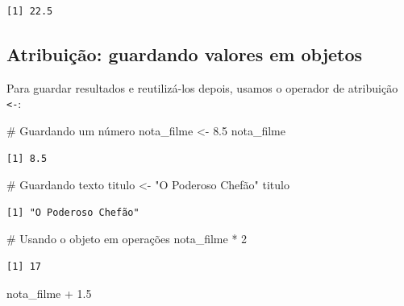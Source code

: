 \documentclass[
  letterpaper,
]{scrbook}
\newenvironment{Shaded}{\begin{snugshade}}{\end{snugshade}}
\newcommand{\CommentTok}[1]{\textcolor[rgb]{0.37,0.37,0.37}{#1}}
\newcommand{\DecValTok}[1]{\textcolor[rgb]{0.68,0.00,0.00}{#1}}
\newcommand{\FloatTok}[1]{\textcolor[rgb]{0.68,0.00,0.00}{#1}}
\newcommand{\NormalTok}[1]{\textcolor[rgb]{0.00,0.23,0.31}{#1}}
\newcommand{\OtherTok}[1]{\textcolor[rgb]{0.00,0.23,0.31}{#1}}
\newcommand{\SpecialCharTok}[1]{\textcolor[rgb]{0.37,0.37,0.37}{#1}}
\newcommand{\StringTok}[1]{\textcolor[rgb]{0.13,0.47,0.30}{#1}}
\begin{document}
\begin{verbatim}
[1] 22.5
\end{verbatim}

\subsection{Atribuição: guardando valores em
objetos}\label{atribuiuxe7uxe3o-guardando-valores-em-objetos}

Para guardar resultados e reutilizá-los depois, usamos o operador de
atribuição \texttt{\textless{}-}:

\begin{Shaded}
\begin{Highlighting}[]
\CommentTok{\# Guardando um número}
\NormalTok{nota\_filme }\OtherTok{\textless{}{-}} \FloatTok{8.5}
\NormalTok{nota\_filme}
\end{Highlighting}
\end{Shaded}

\begin{verbatim}
[1] 8.5
\end{verbatim}

\begin{Shaded}
\begin{Highlighting}[]
\CommentTok{\# Guardando texto}
\NormalTok{titulo }\OtherTok{\textless{}{-}} \StringTok{"O Poderoso Chefão"}
\NormalTok{titulo}
\end{Highlighting}
\end{Shaded}

\begin{verbatim}
[1] "O Poderoso Chefão"
\end{verbatim}

\begin{Shaded}
\begin{Highlighting}[]
\CommentTok{\# Usando o objeto em operações}
\NormalTok{nota\_filme }\SpecialCharTok{*} \DecValTok{2}
\end{Highlighting}
\end{Shaded}

\begin{verbatim}
[1] 17
\end{verbatim}

\begin{Shaded}
\begin{Highlighting}[]
\NormalTok{nota\_filme }\SpecialCharTok{+} \FloatTok{1.5}
\end{Highlighting}
\end{Shaded}
\end{document}
